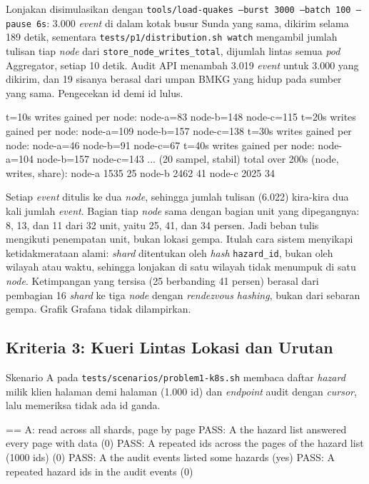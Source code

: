 Lonjakan disimulasikan dengan \texttt{tools/load-quakes --burst 3000 --batch 100 --pause 6s}: 3.000 \textit{event} di dalam kotak busur Sunda yang sama, dikirim selama 189 detik, sementara \texttt{tests/p1/distribution.sh watch} mengambil jumlah tulisan tiap \textit{node} dari \texttt{store\_node\_writes\_total}, dijumlah lintas semua \textit{pod} Aggregator, setiap 10 detik. Audit API menambah 3.019 \textit{event} untuk 3.000 yang dikirim, dan 19 sisanya berasal dari umpan BMKG yang hidup pada sumber yang sama. Pengecekan id demi id lulus.

\begin{codebox}
t=10s writes gained per node: node-a=83 node-b=148 node-c=115
t=20s writes gained per node: node-a=109 node-b=157 node-c=138
t=30s writes gained per node: node-a=46 node-b=91 node-c=67
t=40s writes gained per node: node-a=104 node-b=157 node-c=143
...  (20 sampel, stabil)
total over 200s (node, writes, share):
node-a 1535 25%
node-b 2462 41%
node-c 2025 34%
\end{codebox}

Setiap \textit{event} ditulis ke dua \textit{node}, sehingga jumlah tulisan (6.022) kira-kira dua kali jumlah \textit{event}. Bagian tiap \textit{node} sama dengan bagian unit yang dipegangnya: 8, 13, dan 11 dari 32 unit, yaitu 25, 41, dan 34 persen. Jadi beban tulis mengikuti penempatan unit, bukan lokasi gempa. Itulah cara sistem menyikapi ketidakmerataan alami: \textit{shard} ditentukan oleh \textit{hash} \texttt{hazard\_id}, bukan oleh wilayah atau waktu, sehingga lonjakan di satu wilayah tidak menumpuk di satu \textit{node}. Ketimpangan yang tersisa (25 berbanding 41 persen) berasal dari pembagian 16 \textit{shard} ke tiga \textit{node} dengan \textit{rendezvous hashing}, bukan dari sebaran gempa. Grafik Grafana tidak dilampirkan.

\subsection{Kriteria 3: Kueri Lintas Lokasi dan Urutan}

Skenario A pada \texttt{tests/scenarios/problem1-k8s.sh} membaca daftar \textit{hazard} milik klien halaman demi halaman (1.000 id) dan \textit{endpoint} audit dengan \textit{cursor}, lalu memeriksa tidak ada id ganda.

\begin{codebox}
== A: read across all shards, page by page
PASS: A the hazard list answered every page with data (0)
PASS: A repeated ids across the pages of the hazard list (1000 ids) (0)
PASS: A the audit events listed some hazards (yes)
PASS: A repeated hazard ids in the audit events (0)
\end{codebox}

